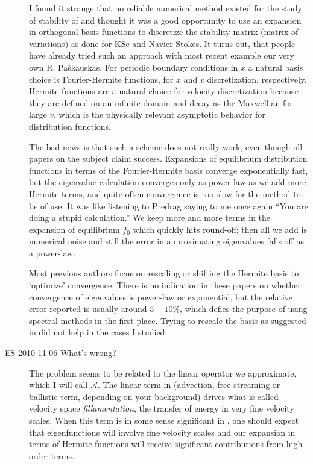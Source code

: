 \begin{description}
I found it strange that no reliable numerical method existed for the study of
stability of  and thought it was a good opportunity to use
an expansion in orthogonal basis functions to discretize the stability matrix
(matrix of variations)
as done for KSe and Navier-Stokes. It turns out,
that people have already tried such an approach with most recent example our
very own R. Pa\v{s}kauskas.  For periodic boundary
conditions in $x$ a natural basis choice is Fourier-Hermite functions, for $x$ and
$v$ discretization, respectively. Hermite functions are a natural choice for
velocity discretization because they are defined on an infinite domain
and decay as the Maxwellian
for large $v$, which is the physically relevant asymptotic behavior for
distribution functions.

The bad news is that such a scheme does not really work, even though all papers
on the subject claim success. Expansions of equilibrium distribution functions
in terms of the Fourier-Hermite basis converge exponentially fast, but the
eigenvalue calculation converges only as power-law as we add more Hermite
terms, and quite often convergence is too slow for the method to be of use.
It was like listening to Predrag
saying to me once again ``You are doing a stupid calculation.''
We keep more and more terms in the expansion of equilibrium $f_0$ which
quickly hits round-off; then all we add is numerical noise and still the
error in approximating eigenvalues falls off as a power-law.

Most previous authors
focus on rescaling or shifting the Hermite basis to `optimize' convergence.
There is no indication in these papers on whether convergence of eigenvalues is power-law or
exponential, but the relative error reported is usually around $5-10\%$, which
defies the purpose of using spectral methods in the first place. Trying to
rescale the basis as suggested in  did not help
in the cases I studied.


\item[ES 2010-11-06 What's wrong?]

The problem seems to be related to the linear operator we approximate, which
I will call $\mathcal{A}$. The linear term in 
(advection, free-streaming or ballistic term, depending on your background)
drives what is called velocity space \emph{fillamentation},
the transfer of energy in very fine velocity scales. When this term is in some
sense significant in , one should expect that eigenfunctions
will involve fine velocity scales and our expansion in terms of Hermite functions
will receive significant contributions from high-order terms.


\end{description}
